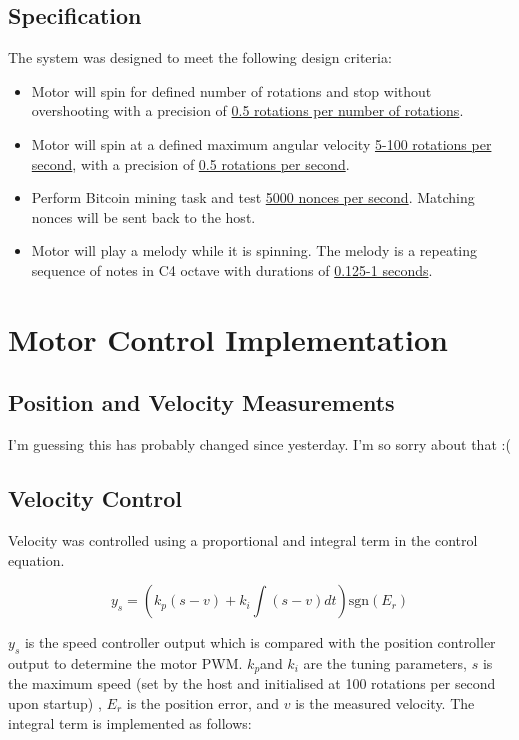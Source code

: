 \documentclass{article}
\begin{document}
\subsection{Specification}
\noindent The system was designed to meet the following design criteria:
 \begin{itemize}
	\item Motor will spin for defined number of rotations and stop without overshooting with a precision of \underline{0.5 rotations per number of rotations}.
	\item Motor will spin at a defined maximum angular velocity \underline{5-100 rotations per second}, with a precision of \underline{0.5 rotations per second}.
	\item Perform Bitcoin mining task and test \underline{5000 nonces per second}. Matching nonces will be sent back to the host.
	\item Motor will play a melody while it is spinning. The melody is a repeating sequence of notes in C4 octave with durations of \underline{0.125-1 seconds}.
\end{itemize}





\section{Motor Control Implementation}
\subsection{Position and Velocity Measurements}

I'm guessing this has probably changed since yesterday. I'm so sorry about that :(

\subsection{Velocity Control}

\noindent
Velocity was controlled using a proportional and integral term in the control equation.

\[ y_s = \left( k_p(s-v)+ k_i\int(s-v)dt\right)\textrm{sgn}(E_r)\]

\noindent
\(y_s\) is the speed controller output which is compared with the position controller output to determine the motor PWM. \(k_p\)and \(k_i\) are the tuning parameters, \(s\) is the maximum speed (set by the host and initialised at 100 rotations per second upon startup) , \(E_r\) is the position error, and \(v\) is the measured velocity. The integral term is implemented as follows:
\end{document}
